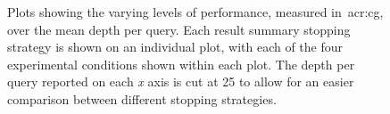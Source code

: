 \begin{figure}[t!]
    \centering
    \caption[Performance plots (diversification)]{Plots showing the varying levels of performance, measured in~\gls{acr:cg}, over the mean depth per query. Each result summary stopping strategy is shown on an individual plot, with each of the four experimental conditions shown within each plot. The depth per query reported on each \emph{x} axis is cut at 25 to allow for an easier comparison between different stopping strategies.}
    \label{fig:ch8_sim_perf_plots}
\end{figure}

